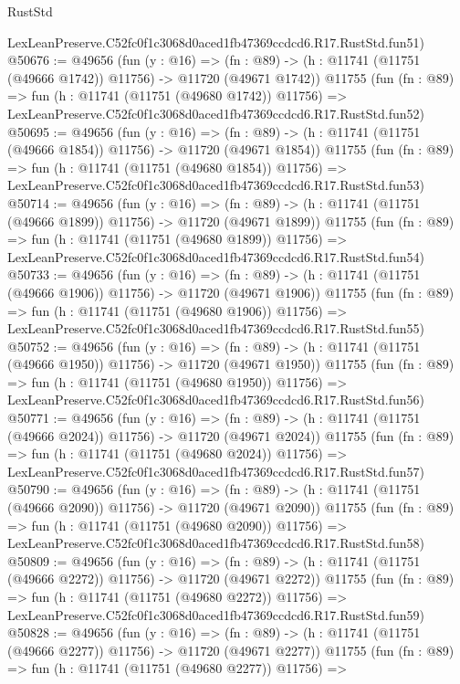 \begin{lexlean}{RustStd}
\begin{coremodule}
    LexLeanPreserve.C52fc0f1c3068d0aced1fb47369ccdcd6.R17.RustStd.fun51)
@50676 := @49656
    (fun (y : @16) =>
    (fn : @89) -> (h : @11741 (@11751 (@49666 @1742)) @11756) -> @11720 (@49671 @1742))
    @11755
    (fun (fn : @89) =>
    fun (h : @11741 (@11751 (@49680 @1742)) @11756) =>
    LexLeanPreserve.C52fc0f1c3068d0aced1fb47369ccdcd6.R17.RustStd.fun52)
@50695 := @49656
    (fun (y : @16) =>
    (fn : @89) -> (h : @11741 (@11751 (@49666 @1854)) @11756) -> @11720 (@49671 @1854))
    @11755
    (fun (fn : @89) =>
    fun (h : @11741 (@11751 (@49680 @1854)) @11756) =>
    LexLeanPreserve.C52fc0f1c3068d0aced1fb47369ccdcd6.R17.RustStd.fun53)
@50714 := @49656
    (fun (y : @16) =>
    (fn : @89) -> (h : @11741 (@11751 (@49666 @1899)) @11756) -> @11720 (@49671 @1899))
    @11755
    (fun (fn : @89) =>
    fun (h : @11741 (@11751 (@49680 @1899)) @11756) =>
    LexLeanPreserve.C52fc0f1c3068d0aced1fb47369ccdcd6.R17.RustStd.fun54)
@50733 := @49656
    (fun (y : @16) =>
    (fn : @89) -> (h : @11741 (@11751 (@49666 @1906)) @11756) -> @11720 (@49671 @1906))
    @11755
    (fun (fn : @89) =>
    fun (h : @11741 (@11751 (@49680 @1906)) @11756) =>
    LexLeanPreserve.C52fc0f1c3068d0aced1fb47369ccdcd6.R17.RustStd.fun55)
@50752 := @49656
    (fun (y : @16) =>
    (fn : @89) -> (h : @11741 (@11751 (@49666 @1950)) @11756) -> @11720 (@49671 @1950))
    @11755
    (fun (fn : @89) =>
    fun (h : @11741 (@11751 (@49680 @1950)) @11756) =>
    LexLeanPreserve.C52fc0f1c3068d0aced1fb47369ccdcd6.R17.RustStd.fun56)
@50771 := @49656
    (fun (y : @16) =>
    (fn : @89) -> (h : @11741 (@11751 (@49666 @2024)) @11756) -> @11720 (@49671 @2024))
    @11755
    (fun (fn : @89) =>
    fun (h : @11741 (@11751 (@49680 @2024)) @11756) =>
    LexLeanPreserve.C52fc0f1c3068d0aced1fb47369ccdcd6.R17.RustStd.fun57)
@50790 := @49656
    (fun (y : @16) =>
    (fn : @89) -> (h : @11741 (@11751 (@49666 @2090)) @11756) -> @11720 (@49671 @2090))
    @11755
    (fun (fn : @89) =>
    fun (h : @11741 (@11751 (@49680 @2090)) @11756) =>
    LexLeanPreserve.C52fc0f1c3068d0aced1fb47369ccdcd6.R17.RustStd.fun58)
@50809 := @49656
    (fun (y : @16) =>
    (fn : @89) -> (h : @11741 (@11751 (@49666 @2272)) @11756) -> @11720 (@49671 @2272))
    @11755
    (fun (fn : @89) =>
    fun (h : @11741 (@11751 (@49680 @2272)) @11756) =>
    LexLeanPreserve.C52fc0f1c3068d0aced1fb47369ccdcd6.R17.RustStd.fun59)
@50828 := @49656
    (fun (y : @16) =>
    (fn : @89) -> (h : @11741 (@11751 (@49666 @2277)) @11756) -> @11720 (@49671 @2277))
    @11755
    (fun (fn : @89) =>
    fun (h : @11741 (@11751 (@49680 @2277)) @11756) =>

\end{coremodule}
\end{lexlean}

